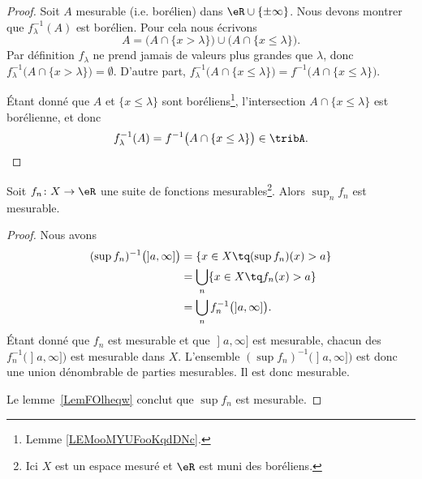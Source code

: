 \begin{proof}
    Soit \( A\) mesurable (i.e. borélien) dans \( \eR\cup\{ \pm\infty \}\). Nous devons montrer que \( f_{\lambda}^{-1}(A)\) est borélien. Pour cela nous écrivons
    \begin{equation}
        A=\Big( A\cap\{ x>\lambda \}\Big)\cup\Big(  A\cap\{ x\leq \lambda \}\Big).
    \end{equation}
    Par définition \( f_{\lambda}\) ne prend jamais de valeurs plus grandes que \( \lambda\), donc \( f_{\lambda}^{-1}\big( A\cap\{ x>\lambda \} \big)=\emptyset\). D'autre part, \( f_{\lambda}^{-1}\big( A\cap\{ x\leq \lambda \} \big)=f^{-1}\big( A\cap\{ x\leq \lambda \} \big)\).

    Étant donné que \( A\) et \( \{ x\leq \lambda \}\) sont boréliens\footnote{Lemme \ref{LEMooMYUFooKqdDNc}.}, l'intersection \( A\cap\{ x\leq \lambda \}\) est borélienne, et donc
    \begin{equation}
        f_{\lambda}^{-1}(A)=f^{-1}\big( A\cap\{ x\leq\lambda \} \big)\in\tribA.
    \end{equation}
\end{proof}

\begin{lemma}   \label{LemIGKvbNR}
	Soit \( f_n\colon X\to \eR\) une suite de fonctions mesurables\footnote{Ici \( X\) est un espace mesuré et \( \eR\) est muni des boréliens.}. Alors \( \sup_n f_n\) est mesurable.
\end{lemma}

\begin{proof}
	Nous avons
	\begin{subequations}
		\begin{align}
			(\sup f_n)^{-1}\big( \mathopen] a , \infty \mathclose] \big) & =\{ x\in X \tq (\sup f_n)(x)>a \}                                \\
			                                                             & =\bigcup_n\{ x\in X\tq f_n(x)>a \}                               \\
			                                                             & =\bigcup_nf_n^{-1}\big( \mathopen] a , \infty \mathclose] \big).
		\end{align}
	\end{subequations}
	Étant donné que \( f_n\) est mesurable et que \( \mathopen] a , \infty \mathclose]\) est mesurable, chacun des \( f_n^{-1}\big( \mathopen] a , \infty \mathclose] \big) \) est mesurable dans \( X\). L'ensemble \( (\sup f_n)^{-1}\big( \mathopen] a , \infty \mathclose] \big)\) est donc une union dénombrable de parties mesurables. Il est donc mesurable.

	Le lemme~\ref{LemFOlheqw} conclut que \( \sup f_n\) est mesurable.
\end{proof}

